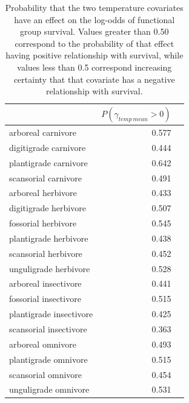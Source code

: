 \documentclass[12pt,letterpaper]{article}
\begin{document}
\begin{table}[ht]
  \centering
  \caption[Posterior probablity of effects of temperature on survival]{Probability that the two temperature covariates have an effect on the log-odds of functional group survival. Values greater than 0.50 correspond to the probability of that effect having positive relationship with survival, while values less than 0.5 correspond increasing certainty that that covariate has a negative relationship with survival.}
  \label{tab:surv_temp}
  \begin{tabular}{ l r r }
    \hline
    & \(P(\gamma_{temp\ mean} > 0)\) \\
    \hline
    arboreal carnivore & 0.577 \\ 
    digitigrade carnivore & 0.444 \\ 
    plantigrade carnivore & 0.642 \\ 
    scansorial carnivore & 0.491 \\ 
    arboreal herbivore & 0.433 \\ 
    digitigrade herbivore & 0.507 \\ 
    fossorial herbivore & 0.545 \\ 
    plantigrade herbivore & 0.438 \\ 
    scansorial herbivore & 0.452 \\ 
    unguligrade herbivore & 0.528 \\ 
    arboreal insectivore & 0.441 \\ 
    fossorial insectivore & 0.515 \\ 
    plantigrade insectivore & 0.425 \\ 
    scansorial insectivore & 0.363 \\ 
    arboreal omnivore & 0.493 \\ 
    plantigrade omnivore & 0.515 \\ 
    scansorial omnivore & 0.454 \\ 
    unguligrade omnivore & 0.531 \\ 
    \hline
  \end{tabular}
\end{table}
\end{document}

